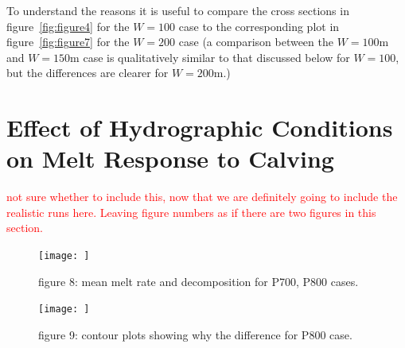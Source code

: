 \documentclass[draft]{agujournal2019}
\newcommand{\red}[1]{\textcolor{red}{#1}}
\begin{document}
To understand the reasons it is useful to compare the cross sections in figure~\ref{fig:figure4} for the $W = 100$ case to the corresponding plot in figure~\ref{fig:figure7} for the $W = 200$ case (a comparison between the $W = 100$m and $W = 150$m case is qualitatively similar to that discussed below for $W = 100$, but the differences are clearer for $W = 200$m.)
%


\section{Effect of Hydrographic Conditions on Melt Response to Calving}\label{S:Results:P}
\red{not sure whether to include this, now that we are definitely going to include the realistic runs here. Leaving figure numbers as if there are two figures in this section.}
\begin{figure}
    \centering
    \texttt{[image: ]}
    \caption{figure 8: mean melt rate and decomposition for P700, P800 cases. }
    \label{fig:my_label}
\end{figure}

\begin{figure}
    \centering
    \texttt{[image: ]}
    \caption{figure 9: contour plots showing why the difference for P800 case. }
    \label{fig:my_label}
\end{figure}
\end{document}
